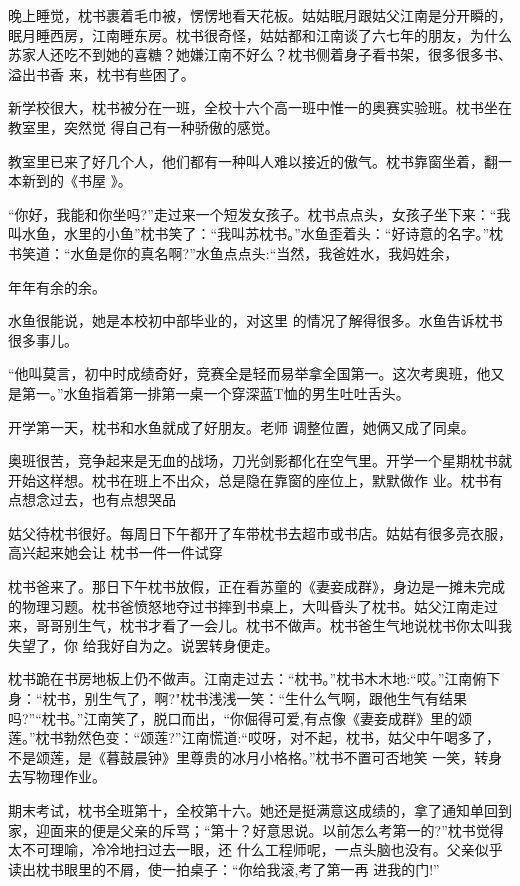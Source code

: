 \documentclass{article}
\begin{document}
\newpage

晚上睡觉，枕书裹着毛巾被，愣愣地看天花板。姑姑眠月跟姑父江南是分开瞬的，眠月睡西房，江南睡东房。枕书很奇怪，姑姑都和江南谈了六七年的朋友，为什么苏家人还吃不到她的喜糖？她嫌江南不好么？枕书侧着身子看书架，很多很多书、溢出书香
来，枕书有些困了。 

新学校很大，枕书被分在一班，全校十六个高一班中惟一的奥赛实验班。枕书坐在教室里，突然觉
得自己有一种骄傲的感觉。 

教室里已来了好几个人，他们都有一种叫人难以接近的傲气。枕书靠窗坐着，翻一本新到的《书屋
》。 

“你好，我能和你坐吗?”走过来一个短发女孩子。枕书点点头，女孩子坐下来：“我叫水鱼，水里的小鱼”枕书笑了：“我叫苏枕书。”水鱼歪着头：“好诗意的名字。”枕书笑道：“水鱼是你的真名啊?”水鱼点点头:“当然，我爸姓水，我妈姓余，

\newpage
年年有余的余。 

水鱼很能说，她是本校初中部毕业的，对这里
的情况了解得很多。水鱼告诉枕书很多事儿。 

“他叫莫言，初中时成绩奇好，竞赛全是轻而易举拿全国第一。这次考奥班，他又是第一。”水鱼指着第一排第一桌一个穿深蓝T恤的男生吐吐舌头。
 

开学第一天，枕书和水鱼就成了好朋友。老师
调整位置，她俩又成了同桌。 

奥班很苦，竞争起来是无血的战场，刀光剑影都化在空气里。开学一个星期枕书就开始这样想。枕书在班上不出众，总是隐在靠窗的座位上，默默做作
业。枕书有点想念过去，也有点想哭品 

姑父待枕书很好。每周日下午都开了车带枕书去超市或书店。姑姑有很多亮衣服，高兴起来她会让
枕书一件一件试穿 

\newpage

枕书爸来了。那日下午枕书放假，正在看苏童的《妻妾成群》，身边是一摊未完成的物理习题。枕书爸愤怒地夺过书摔到书桌上，大叫昏头了枕书。姑父江南走过来，哥哥别生气，枕书才看了一会儿。枕书不做声。枕书爸生气地说枕书你太叫我失望了，你
给我好自为之。说罢转身便走。 

枕书跪在书房地板上仍不做声。江南走过去：“枕书。”枕书木木地:“哎。”江南俯下身：“枕书，别生气了，啊?"枕书浅浅一笑：“生什么气啊，跟他生气有结果吗?”“枕书。”江南笑了，脱口而出，“你倔得可爱,有点像《妻妾成群》里的颂莲。”枕书勃然色变：“颂莲?”江南慌道:“哎呀，对不起，枕书，姑父中午喝多了，不是颂莲，是《暮鼓晨钟》里尊贵的冰月小格格。”枕书不置可否地笑
一笑，转身去写物理作业。 

期末考试，枕书全班第十，全校第十六。她还是挺满意这成绩的，拿了通知单回到家，迎面来的便是父亲的斥骂；“第十？好意思说。以前怎么考第一的?”枕书觉得太不可理喻，冷冷地扫过去一眼，还
\newpage
什么工程师呢，一点头脑也没有。父亲似乎读出枕书眼里的不屑，使一拍桌子：“你给我滚,考了第一再
进我的门!” 
\end{document}
